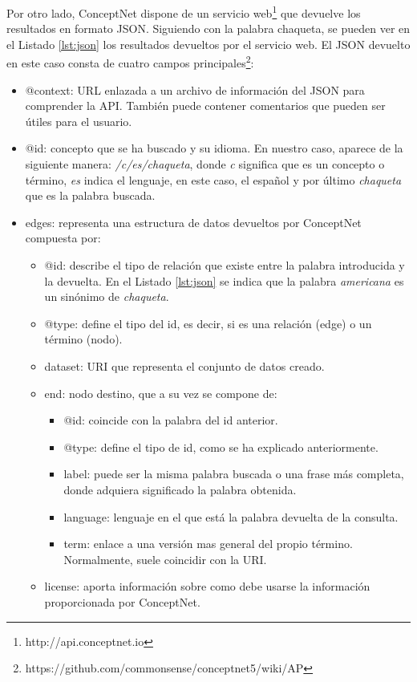 Por otro lado, ConceptNet dispone de un servicio web\footnote{http://api.conceptnet.io} que devuelve los resultados en formato JSON. Siguiendo con la palabra chaqueta, se pueden ver en el Listado \ref{lst:json} los resultados devueltos por el servicio web. El JSON devuelto en este caso consta de cuatro campos principales\footnote{https://github.com/commonsense/conceptnet5/wiki/AP}:
\begin{itemize}
	\item @context: URL enlazada a un archivo de información del JSON para comprender la API. También puede contener comentarios que pueden ser útiles para el usuario.
	\item @id: concepto que se ha buscado y su idioma. En nuestro caso, aparece de la siguiente manera: \textit{/c/es/chaqueta}, donde  \textit{c} significa que es un concepto o término,  \textit{es} indica el lenguaje, en este caso, el español y por último \textit{chaqueta} que es la palabra buscada.
	\item edges: representa una estructura de datos devueltos por ConceptNet compuesta por:
	\begin{itemize}
		\item @id: describe el tipo de relación que existe entre la palabra introducida y la devuelta. En el Listado \ref{lst:json} se indica que la palabra \textit{americana} es un sinónimo de \textit{chaqueta}.
		\item @type: define el tipo del id, es decir, si es una relación (edge) o un término (nodo).
		\item dataset: URI que representa el conjunto de datos creado.
		\item end: nodo destino, que a su vez se compone de:	
		\begin{itemize}
			\item @id: coincide con la palabra del id anterior.
			\item @type: define el tipo de id, como se ha explicado anteriormente.
			\item label: puede ser la misma palabra buscada o una frase más completa, donde adquiera significado la palabra obtenida.
			\item language: lenguaje en el que está la palabra devuelta de la consulta.
			\item term: enlace a una versión mas general del propio término. Normalmente, suele coincidir con la URI.			
		\end{itemize}
		\item license: aporta información sobre como debe usarse la información proporcionada por ConceptNet.

\end{itemize}
\end{itemize}
